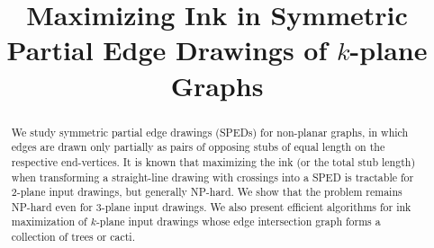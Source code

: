 %
%


\title{Maximizing Ink in Symmetric Partial Edge Drawings of $k$-plane Graphs}

%

{} %

%
%

%


\begin{abstract}
%
	We study symmetric partial edge drawings (SPEDs) for non-planar graphs, in which edges are drawn only partially as pairs of opposing stubs of equal length on the respective end-vertices. It is known that maximizing the ink (or the total stub length) when transforming a straight-line drawing with crossings into a SPED is tractable for 2-plane input drawings, but generally NP-hard. We show that the problem remains NP-hard even for 3-plane input drawings. We also present efficient algorithms for ink maximization of $k$-plane input drawings whose edge intersection graph forms a collection of trees or cacti. %

\end{abstract}

